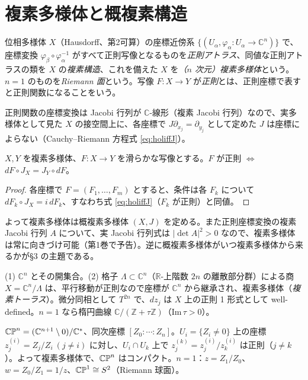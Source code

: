 \section{複素多様体と概複素構造}\label{sec:cplxmfd}

\begin{defn}[複素多様体]
位相多様体 $X$（Hausdorff、第2可算）の座標近傍系 $\{(U_\alpha,\varphi_\alpha:U_\alpha\to\mathbb C^n)\}$ で、座標変換 $\varphi_\beta\circ\varphi_\alpha^{-1}$ がすべて正則写像となるものを\emph{正則アトラス}、同値な正則アトラスの類を $X$ の\emph{複素構造}、これを備えた $X$ を\emph{（$n$ 次元）複素多様体}という。$n=1$ のものを\emph{Riemann 面}という。写像 $F:X\to Y$ が\emph{正則}とは、正則座標で表すと正則関数になることをいう。
\end{defn}
正則関数の座標変換は Jacobi 行列が $\mathbb C$-線形（複素 Jacobi 行列）なので、実多様体として見た $X$ の接空間上に、各座標で $J\partial_{x_j}=\partial_{y_j}$ として定めた $J$ は座標によらない（Cauchy--Riemann 方程式 \eqref{eq:holiffJ}）。

\begin{prop}\label{prop:holJ}
$X,Y$ を複素多様体、$F:X\to Y$ を滑らかな写像とする。$F$ が正則 $\iff$ $dF\circ J_X=J_Y\circ dF$。
\end{prop}
\begin{proof}
各座標で $F=(F_1,\dots,F_m)$ とすると、条件は各 $F_k$ について $dF_k\circ J_X=i\,dF_k$、すなわち式 \eqref{eq:holiffJ}（$F_k$ が正則）と同値。\qedhere
\end{proof}
よって複素多様体は概複素多様体 $(X,J)$ を定める。また正則座標変換の複素 Jacobi 行列 $A$ について、実 Jacobi 行列式は $|\det A|^2>0$ なので、複素多様体は常に向きづけ可能（第1巻で予告）。逆に概複素多様体がいつ複素多様体から来るかが§3 の主題である。

\begin{ex}\label{ex:basic}
(1) $\mathbb C^n$ とその開集合。(2) 格子 $\Lambda\subset\mathbb C^n$（$\mathbb R$-上階数 $2n$ の離散部分群）による商 $X=\mathbb C^n/\Lambda$ は、平行移動が正則なので座標が $\mathbb C^n$ から継承され、複素多様体（\emph{複素トーラス}）。微分同相として $T^{2n}$ で、$dz_j$ は $X$ 上の正則 1 形式として well-defined。$n=1$ なら楕円曲線 $\mathbb C/(\mathbb Z+\tau\mathbb Z)$（$\mathrm{Im}\,\tau>0$）。
\end{ex}

\begin{ex}[複素射影空間]\label{ex:cpn}
$\mathbb{CP}^n=(\mathbb C^{n+1}\setminus 0)/\mathbb C^*$、同次座標 $[Z_0:\cdots:Z_n]$。$U_i=\{Z_i\ne0\}$ 上の座標 $z^{(i)}_j=Z_j/Z_i\ (j\ne i)$ に対し、$U_i\cap U_k$ 上で $z^{(k)}_j=z^{(i)}_j/z^{(i)}_k$ は正則（$j\ne k$）。よって複素多様体で、$\mathbb{CP}^n$ はコンパクト。$n=1$：$z=Z_1/Z_0$、$w=Z_0/Z_1=1/z$、$\mathbb{CP}^1\cong S^2$（Riemann 球面）。
\end{ex}

